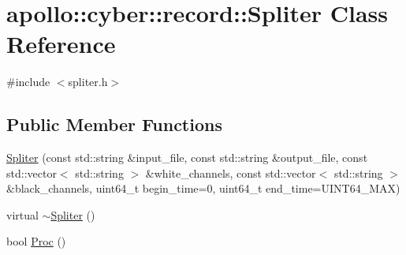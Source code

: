 \hypertarget{classapollo_1_1cyber_1_1record_1_1Spliter}{\section{apollo\-:\-:cyber\-:\-:record\-:\-:Spliter Class Reference}
\label{classapollo_1_1cyber_1_1record_1_1Spliter}
}


{\ttfamily \#include $<$spliter.\-h$>$}

\subsection*{Public Member Functions}
\begin{DoxyCompactItemize}
\item 
\hyperlink{classapollo_1_1cyber_1_1record_1_1Spliter_a4deaed47c20b9f42b79ea0023f7858d3}{Spliter} (const std\-::string \&input\-\_\-file, const std\-::string \&output\-\_\-file, const std\-::vector$<$ std\-::string $>$ \&white\-\_\-channels, const std\-::vector$<$ std\-::string $>$ \&black\-\_\-channels, uint64\-\_\-t begin\-\_\-time=0, uint64\-\_\-t end\-\_\-time=U\-I\-N\-T64\-\_\-\-M\-A\-X)
\item 
virtual \hyperlink{classapollo_1_1cyber_1_1record_1_1Spliter_a277a5e6ef85e3193f224f5b5747f74bd}{$\sim$\-Spliter} ()
\item 
bool \hyperlink{classapollo_1_1cyber_1_1record_1_1Spliter_a511389e96a67a0d37977434f9a0e9200}{Proc} ()
\end{DoxyCompactItemize}
